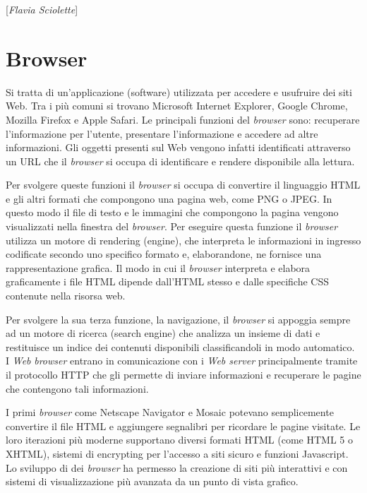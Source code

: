 \hrulefill 

{[}\emph{Flavia Sciolette}{]}

\chapter{Browser}

Si tratta di un'applicazione (software) utilizzata per accedere e
usufruire dei siti Web. Tra i più comuni si trovano Microsoft Internet
Explorer, Google Chrome, Mozilla Firefox e Apple Safari. Le principali
funzioni del \emph{browser} sono: recuperare l'informazione per
l'utente, presentare l'informazione e accedere ad altre informazioni.
Gli oggetti presenti sul Web vengono infatti identificati attraverso un
URL che il \emph{browser} si occupa di identificare e rendere
disponibile alla lettura.

Per svolgere queste funzioni il \emph{browser} si occupa di convertire
il linguaggio HTML e gli altri formati che compongono una pagina web,
come PNG o JPEG. In questo modo il file di testo e le immagini che
compongono la pagina vengono visualizzati nella finestra del
\emph{browser}. Per eseguire questa funzione il \emph{browser} utilizza
un motore di rendering (engine), che interpreta le informazioni in
ingresso codificate secondo uno specifico formato e, elaborandone, ne
fornisce una rappresentazione grafica. Il modo in cui il \emph{browser}
interpreta e elabora graficamente i file HTML dipende dall'HTML stesso e
dalle specifiche CSS contenute nella risorsa web.

Per svolgere la sua terza funzione, la navigazione, il \emph{browser} si
appoggia sempre ad un motore di ricerca (search engine) che analizza un
insieme di dati e restituisce un indice dei contenuti disponibili
classificandoli in modo automatico. I \emph{Web} \emph{browser} entrano
in comunicazione con i \emph{Web server} principalmente tramite il
protocollo HTTP che gli permette di inviare informazioni e recuperare le
pagine che contengono tali informazioni.

I primi \emph{browser} come Netscape Navigator e Mosaic potevano
semplicemente convertire il file HTML e aggiungere segnalibri per
ricordare le pagine visitate. Le loro iterazioni più moderne supportano
diversi formati HTML (come HTML 5 o XHTML), sistemi di encrypting per
l'accesso a siti sicuro e funzioni Javascript. Lo sviluppo di dei
\emph{browser} ha permesso la creazione di siti più interattivi e con
sistemi di visualizzazione più avanzata da un punto di vista grafico.

